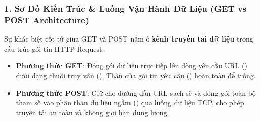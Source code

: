 \subsubsection{1. Sơ Đồ Kiến Trúc \& Luồng Vận Hành Dữ Liệu (GET vs POST Architecture)}

\begin{conceptBox}
Sự khác biệt cốt tử giữa GET và POST nằm ở \textbf{kênh truyền tải dữ liệu} trong cấu trúc gói tin HTTP Request:
\begin{itemize}[leftmargin=1.5em, itemsep=3pt, parsep=0pt]
    \item \textbf{Phương thức GET}: Đóng gói dữ liệu trực tiếp lên dòng yêu cầu URL () dưới dạng chuỗi truy vấn (). Thân của gói tin yêu cầu () hoàn toàn để trống.
    \item \textbf{Phương thức POST}: Giữ cho đường dẫn URL sạch sẽ và đóng gói toàn bộ tham số vào phần thân dữ liệu ngầm () qua luồng dữ liệu TCP, cho phép truyền tải an toàn và không giới hạn dung lượng.
\end{itemize}
\end{conceptBox}

